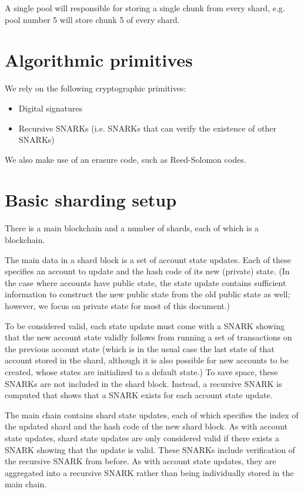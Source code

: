 \documentclass{article}
\begin{document}
A single pool will responsible for storing a single chunk from every shard, e.g. pool number 5 will store chunk 5 of every shard.

\section{Algorithmic primitives}

We rely on the following cryptographic primitives:

\begin{itemize}
  \item Digital signatures
  \item Recursive SNARKs (i.e. SNARKs that can verify the existence of other SNARKs)
\end{itemize}

We also make use of an erasure code, such as Reed-Solomon codes.

\section{Basic sharding setup}

There is a main blockchain and a number of shards, each of which is a blockchain.

The main data in a shard block is a set of account state updates.  Each of these specifies an account to update and the hash code of its new (private) state.  (In the case where accounts have public state, the state update contains sufficient information to construct the new public state from the old public state as well; however, we focus on private state for most of this document.)

To be considered valid, each state update must come with a SNARK showing that the new account state validly follows from running a set of transactions on the previous account state (which is in the usual case the last state of that account stored in the shard, although it is also possible for new accounts to be created, whose states are initialized to a default state.)  To save space, these SNARKs are not included in the shard block.  Instead, a recursive SNARK is computed that shows that a SNARK exists for each account state update.

The main chain contains shard state updates, each of which specifies the index of the updated shard and the hash code of the new shard block.  As with account state updates, shard state updates are only considered valid if there exists a SNARK showing that the update is valid.  These SNARKs include verification of the recursive SNARK from before.  As with account state updates, they are aggregated into a recursive SNARK rather than being individually stored in the main chain.
 
\end{document}
